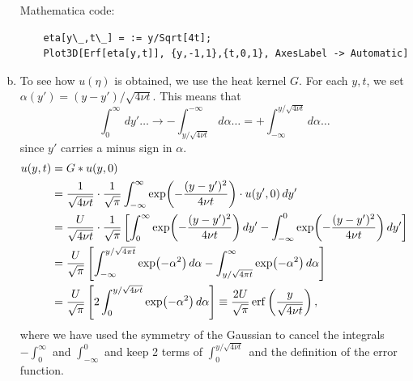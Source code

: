 \documentclass[11pt]{article}
\newcommand{\f}[2]{\frac{#1}{#2}}
\begin{document}
\begin{enumerate}[(a)]
	Mathematica code: 
	\begin{lstlisting}
	eta[y\_,t\_] = := y/Sqrt[4t]; 
	Plot3D[Erf[eta[y,t]], {y,-1,1},{t,0,1}, AxesLabel -> Automatic]
	\end{lstlisting}

	
	
	
	\item To see how $u(\eta)$ is obtained, we use the heat kernel $G$.  For each $y,t$, we set $\alpha(y') = (y-y')/\sqrt{4\nu t}$. This means that 
	\begin{equation*}
	\int_0^\infty\,dy'\dots \to -\int_{y/\sqrt{4\nu t}}^{-\infty} d\alpha \dots = +\int^{y/\sqrt{4\nu t}}_{-\infty} d\alpha \dots
	\end{equation*}
	since $y'$ carries a minus sign in $\alpha$. 
	\begin{align*}
	u(y,t) 
	&= G\ast u(y,0) \\
	&= \f{1}{\sqrt{4\nu t}}\cdot \f{1}{\sqrt{\pi}} \int^\infty_{-\infty} \exp(-\f{(y-y')^2}{4\nu t}) \cdot u(y',0)\,dy' \\
	&= \f{U}{\sqrt{4\nu t}}\cdot \f{1}{\sqrt{\pi}}\left[   
	\int_0^\infty \exp(-\f{(y-y')^2}{4\nu t}) \,dy' - \int_{-\infty}^0 \exp(-\f{(y-y')^2}{4\nu t}) \,dy'
	\right]\\
	&= \f{U}{\sqrt{\pi}}\left[ \int_{-\infty}^{y/\sqrt{4\pi t}} \exp(-\alpha^2) \,d\alpha -  
	\int_{y/\sqrt{4\pi t}}^\infty \exp(-\alpha^2) \,d\alpha
	\right]\\
	&= \f{U}{\sqrt{\pi}}\left[2\int_0^{y/\sqrt{4\nu t}} \exp(-\alpha^2)\,d\alpha \right] \equiv \f{2U}{\sqrt{\pi}}\erf\left( \f{y}{\sqrt{4\nu t}}\right),
	\end{align*}
	where we have used the symmetry of the Gaussian to cancel the integrals $-\int^\infty_0$ and $\int^0_{-\infty}$ and keep 2 terms of $\int_0^{y/\sqrt{4\nu t}}$ and the definition of the error function. 
	

\end{enumerate}
\end{document}
